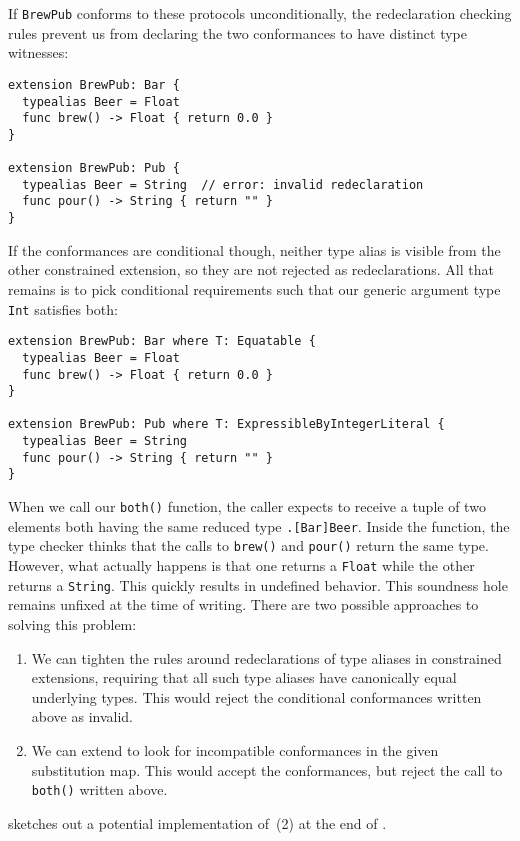 \documentclass[../generics]{subfiles}
\begin{document}
If \texttt{BrewPub} conforms to these protocols unconditionally, the redeclaration checking rules prevent us from declaring the two conformances to have distinct type witnesses:
\begin{Verbatim}
extension BrewPub: Bar {
  typealias Beer = Float
  func brew() -> Float { return 0.0 }
}

extension BrewPub: Pub {
  typealias Beer = String  // error: invalid redeclaration
  func pour() -> String { return "" }
}
\end{Verbatim}
If the conformances are conditional though, neither type alias is visible from the other constrained extension, so they are not rejected as redeclarations. All that remains is to pick conditional requirements such that our generic argument type \texttt{Int} satisfies both:
\begin{Verbatim}
extension BrewPub: Bar where T: Equatable {
  typealias Beer = Float
  func brew() -> Float { return 0.0 }
}

extension BrewPub: Pub where T: ExpressibleByIntegerLiteral {
  typealias Beer = String
  func pour() -> String { return "" }
}
\end{Verbatim}
When we call our \texttt{both()} function, the caller expects to receive a tuple of two elements both having the same reduced type \texttt{.[Bar]Beer}. Inside the function, the type checker thinks that the calls to \texttt{brew()} and \texttt{pour()} return the same type. However, what actually happens is that one returns a \texttt{Float} while the other returns a \texttt{String}. This quickly results in undefined behavior. This soundness hole remains unfixed at the time of writing. There are two possible approaches to solving this problem:
\begin{enumerate}
\item We can tighten the rules around redeclarations of type aliases in constrained extensions, requiring that all such type aliases have canonically equal underlying types. This would reject the conditional conformances written above as invalid.
\item We can extend  to look for incompatible conformances in the given substitution map. This would accept the conformances, but reject the call to \texttt{both()} written above.
\end{enumerate}
 sketches out a potential implementation of~(2) at the end of .
\end{document}
